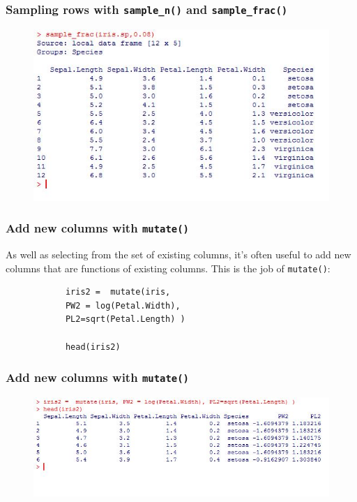 \documentclass{beamer}
\begin{document}
	\begin{frame}
		\frametitle{Sampling rows with \texttt{sample\_n()} and \texttt{sample\_frac()}}
		
		\begin{figure}
			\centering
			\includegraphics[width=1.07\linewidth]{images/irissample3}
		\end{figure}
		
	\end{frame}
	\begin{frame}[fragile]
		\frametitle{Add new columns with \texttt{mutate()} }
		
		As well as selecting from the set of existing columns, it’s often useful to add new columns that are functions of existing columns. This is the job of \texttt{mutate()}:
		
		\begin{framed}
			\begin{verbatim}
			iris2 =  mutate(iris, 
			PW2 = log(Petal.Width), 
			PL2=sqrt(Petal.Length) )
			
			head(iris2)
			\end{verbatim}
		\end{framed}
	\end{frame}
	\begin{frame}
		
		\frametitle{Add new columns with \texttt{mutate()} }
		\begin{figure}
			\centering
			\includegraphics[width=1.2\linewidth]{images/irismutate}
			
		\end{figure}
		
	\end{frame}
\end{document}
